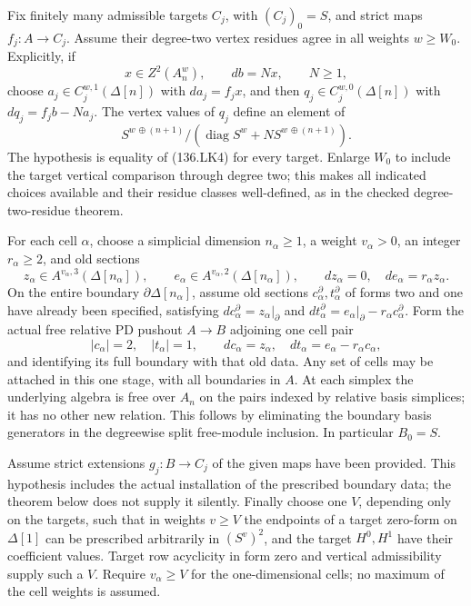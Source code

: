 Fix finitely many admissible targets \(C_j\), with
\((C_j)_0=S\), and strict maps \(f_j:A\to C_j\).
Assume their degree-two vertex residues agree in all weights
\(w\geq W_0\).  Explicitly, if
\[
 x\in Z^2(A_n^w),\qquad db=Nx,\qquad N\geq1,
                                                               \tag{136.LK3}
\]
choose \(a_j\in C_j^{w,1}(\Delta[n])\) with
\(da_j=f_jx\), and then \(q_j\in C_j^{w,0}(\Delta[n])\)
with \(dq_j=f_jb-Na_j\).  The vertex values of \(q_j\)
define an element of
\[
              S^{w\,\oplus(n+1)}/
                    (\operatorname{diag}S^w+N S^{w\,\oplus(n+1)}).
                                                               \tag{136.LK4}
\]
The hypothesis is equality of (136.LK4) for every target.
Enlarge \(W_0\) to include the target vertical comparison
through degree two; this makes all indicated choices available
and their residue classes well-defined, as in the checked
degree-two-residue theorem.

For each cell \(\alpha\), choose a simplicial dimension
\(n_\alpha\geq1\), a weight \(v_\alpha>0\), an integer
\(r_\alpha\geq2\), and old sections
\[
 z_\alpha\in A^{v_\alpha,3}(\Delta[n_\alpha]),\qquad
 e_\alpha\in A^{v_\alpha,2}(\Delta[n_\alpha]),\qquad
 dz_\alpha=0,\quad de_\alpha=r_\alpha z_\alpha.
                                                               \tag{136.LK5}
\]
On the entire boundary \(\partial\Delta[n_\alpha]\),
assume old sections \(c_\alpha^\partial,t_\alpha^\partial\)
of forms two and one have already been specified, satisfying
\(dc_\alpha^\partial=z_\alpha|_\partial\) and
\(dt_\alpha^\partial=e_\alpha|_\partial-r_\alpha
c_\alpha^\partial\).
Form the actual free relative PD pushout \(A\to B\)
adjoining one cell pair
\[
       |c_\alpha|=2,\quad |t_\alpha|=1,\qquad
       dc_\alpha=z_\alpha,\quad
       dt_\alpha=e_\alpha-r_\alpha c_\alpha,
                                                               \tag{136.LK6}
\]
and identifying its full boundary with that old data.  Any set
of cells may be attached in this one stage, with all boundaries
in \(A\).  At each simplex the underlying algebra is free
over \(A_n\) on the pairs indexed by relative basis simplices;
it has no other new relation.  This follows by eliminating the
boundary basis generators in the degreewise split free-module
inclusion.  In particular \(B_0=S\).

Assume strict extensions \(g_j:B\to C_j\) of the given
maps have been provided.  This hypothesis includes the actual
installation of the prescribed boundary data; the theorem below
does not supply it silently.  Finally choose one \(V\),
depending only on the targets, such that in weights \(v\geq V\)
the endpoints of a target zero-form on \(\Delta[1]\) can be
prescribed arbitrarily in \((S^v)^2\), and the target
\(H^0,H^1\) have their coefficient values.  Target row
acyclicity in form zero and vertical admissibility supply such
a \(V\).  Require \(v_\alpha\geq V\) for the one-dimensional
cells; no maximum of the cell weights is assumed.

